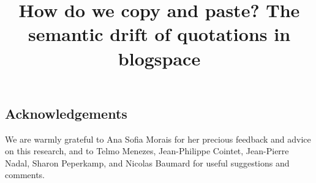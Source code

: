 \documentclass[jou]{apa6}
\title{How do we copy and paste? The semantic drift of quotations in blogspace}
\date{}
\begin{document}
\maketitle







\subsection*{Acknowledgements}

We are warmly grateful to Ana Sofia Morais for her precious feedback and advice on this research, and to Telmo Menezes, Jean-Philippe Cointet, Jean-Pierre Nadal, Sharon Peperkamp, and Nicolas Baumard for useful suggestions and comments.




%
\end{document}
